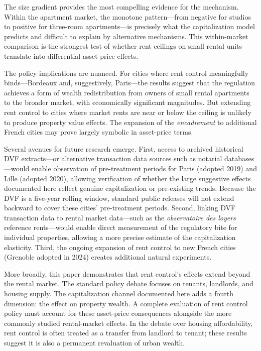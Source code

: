 \documentclass[12pt]{article}
\begin{document}
The size gradient provides the most compelling evidence for the mechanism. Within the apartment market, the monotone pattern---from negative for studios to positive for three-room apartments---is precisely what the capitalization model predicts and difficult to explain by alternative mechanisms. This within-market comparison is the strongest test of whether rent ceilings on small rental units translate into differential asset price effects.

The policy implications are nuanced. For cities where rent control meaningfully binds---Bordeaux and, suggestively, Paris---the results suggest that the regulation achieves a form of wealth redistribution from owners of small rental apartments to the broader market, with economically significant magnitudes. But extending rent control to cities where market rents are near or below the ceiling is unlikely to produce property value effects. The expansion of the \emph{encadrement} to additional French cities may prove largely symbolic in asset-price terms.

Several avenues for future research emerge. First, access to archived historical DVF extracts---or alternative transaction data sources such as notarial databases---would enable observation of pre-treatment periods for Paris (adopted 2019) and Lille (adopted 2020), allowing verification of whether the large suggestive effects documented here reflect genuine capitalization or pre-existing trends. Because the DVF is a five-year rolling window, standard public releases will not extend backward to cover these cities' pre-treatment periods. Second, linking DVF transaction data to rental market data---such as the \emph{observatoire des loyers} reference rents---would enable direct measurement of the regulatory bite for individual properties, allowing a more precise estimate of the capitalization elasticity. Third, the ongoing expansion of rent control to new French cities (Grenoble adopted in 2024) creates additional natural experiments.

More broadly, this paper demonstrates that rent control's effects extend beyond the rental market. The standard policy debate focuses on tenants, landlords, and housing supply. The capitalization channel documented here adds a fourth dimension: the effect on property wealth. A complete evaluation of rent control policy must account for these asset-price consequences alongside the more commonly studied rental-market effects. In the debate over housing affordability, rent control is often treated as a transfer from landlord to tenant; these results suggest it is also a permanent revaluation of urban wealth.
\end{document}
